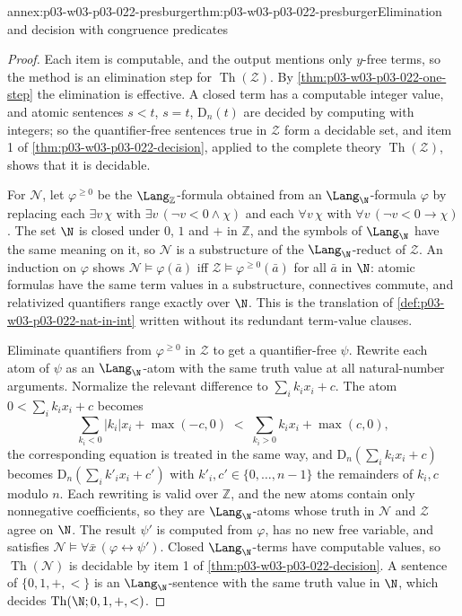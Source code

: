 \begin{annexitem}{annex:p03-w03-p03-022-presburger}{thm:p03-w03-p03-022-presburger}{Elimination and decision with congruence predicates}
\begin{proof}
Each item is computable, and the output mentions only \(y\)-free terms, so
the method is an elimination step for \(\operatorname{Th}(\mathcal Z)\). By
\cref{thm:p03-w03-p03-022-one-step} the elimination is effective. A closed
term has a computable integer value, and atomic sentences
\(s<t\), \(s=t\), \(\mathrm D_n(t)\) are decided by computing with integers;
so the quantifier-free sentences true in \(\mathcal Z\) form a decidable set,
and item 1 of \cref{thm:p03-w03-p03-022-decision}, applied to the complete
theory \(\operatorname{Th}(\mathcal Z)\), shows that it is decidable.

For \(\mathcal N\), let \(\varphi^{\ge0}\) be the \(\Lang_{\mathbb Z}\)-formula
obtained from an \(\Lang_{\N}\)-formula \(\varphi\) by replacing each
\(\exists v\,\chi\) with \(\exists v\,(\neg v<0\land\chi)\) and each
\(\forall v\,\chi\) with \(\forall v\,(\neg v<0\to\chi)\). The set \(\N\) is closed
under \(0\), \(1\) and \(+\) in \(\mathbb Z\), and the symbols of
\(\Lang_{\N}\) have the same meaning on it, so \(\mathcal N\) is a substructure
of the \(\Lang_{\N}\)-reduct of \(\mathcal Z\). An induction on \(\varphi\)
shows \(\mathcal N\models\varphi(\bar a)\) iff
\(\mathcal Z\models\varphi^{\ge0}(\bar a)\) for all \(\bar a\) in \(\N\):
atomic formulas have the same term values in a substructure, connectives
commute, and relativized quantifiers range exactly over \(\N\). This is the
translation of \cref{def:p03-w03-p03-022-nat-in-int} written without its
redundant term-value clauses.

Eliminate quantifiers from \(\varphi^{\ge0}\) in \(\mathcal Z\) to get a
quantifier-free \(\psi\). Rewrite each atom of \(\psi\) as an
\(\Lang_{\N}\)-atom with the same truth value at all natural-number
arguments. Normalize the relevant difference to \(\sum_ik_ix_i+c\). The atom
\(0<\sum_ik_ix_i+c\) becomes
\[
 \sum_{k_i<0}|k_i|x_i+\max(-c,0)\;<\;\sum_{k_i>0}k_ix_i+\max(c,0),
\]
the corresponding equation is treated in the same way, and
\(\mathrm D_n(\sum_ik_ix_i+c)\) becomes \(\mathrm D_n(\sum_ik'_ix_i+c')\)
with \(k'_i,c'\in\{0,\ldots,n-1\}\) the remainders of \(k_i,c\) modulo
\(n\). Each rewriting is valid over \(\mathbb Z\), and the new atoms contain
only nonnegative coefficients, so they are \(\Lang_{\N}\)-atoms whose truth
in \(\mathcal N\) and \(\mathcal Z\) agree on \(\N\). The result \(\psi'\) is
computed from \(\varphi\), has no new free variable, and satisfies
\(\mathcal N\models\forall\bar x\,(\varphi\leftrightarrow\psi')\). Closed
\(\Lang_{\N}\)-terms have computable values, so
\(\operatorname{Th}(\mathcal N)\) is decidable by item 1 of
\cref{thm:p03-w03-p03-022-decision}. A sentence of \(\{0,1,+,<\}\) is an
\(\Lang_{\N}\)-sentence with the same truth value in \(\N\), which decides
\(\operatorname{Th}(\N;0,1,+,<)\).
\end{proof}
\end{annexitem}

